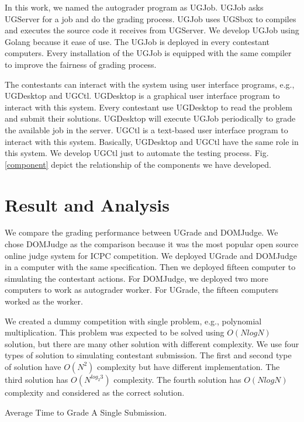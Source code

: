 \documentclass[conference]{IEEEtran}
\begin{document}
In this work, we named the autograder program as UGJob. UGJob asks UGServer for a job and do the grading process. UGJob uses UGSbox to compiles and executes the source code it receives from UGServer. We develop UGJob using Golang because it ease of use. The UGJob is deployed in every contestant computers. Every installation of the UGJob is equipped with the same compiler to improve the fairness of grading process.

The contestants can interact with the system using user interface programs, e.g., UGDesktop and UGCtl. UGDesktop is a graphical user interface program to interact with this system. Every contestant use UGDesktop to read the problem and submit their solutions. UGDesktop will execute UGJob periodically to grade the available job in the server. UGCtl is a text-based user interface program to interact with this system. Basically, UGDesktop and UGCtl have the same role in this system. We develop UGCtl just to automate the testing process. Fig. \ref{component} depict the relationship of the components we have developed.

\section{Result and Analysis}

We compare the grading performance between UGrade and DOMJudge. We chose DOMJudge as the comparison because it was the most popular open source online judge system for ICPC competition. We deployed UGrade and DOMJudge in a computer with the same specification. Then we deployed fifteen computer to simulating the contestant actions. For DOMJudge, we deployed two more computers to work as autograder worker. For UGrade, the fifteen computers worked as the worker.

We created a dummy competition with single problem, e.g., polynomial multiplication. This problem was expected to be solved using $O(N log N)$ solution, but there are many other solution with different complexity. We use four types of solution to simulating contestant submission. The first and second type of solution have $O(N^2)$ complexity but have different implementation. The third solution has $O(N^{log_2{3}})$ complexity. The fourth solution has $O(N log N)$ complexity and considered as the correct solution.

\begin{table}[ht!]
    \label{grading-time}
    \caption{Average Time to Grade A Single Submission.}
    \begin{center}
        
    \end{center}
\end{table}
\end{document}
